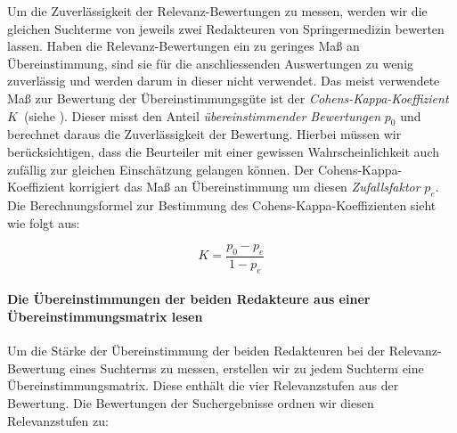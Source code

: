 Um die Zuverlässigkeit der Relevanz-Bewertungen zu messen, werden wir die gleichen Suchterme von jeweils zwei Redakteuren von Springermedizin bewerten lassen. Haben die Relevanz-Bewertungen ein zu geringes Maß an Übereinstimmung, sind sie für die anschliessenden Auswertungen zu wenig zuverlässig und werden darum in dieser nicht verwendet. Das meist verwendete Maß zur Bewertung der Übereinstimmungsgüte ist der \textit{Cohens-Kappa-Koeffizient} $K$~(siehe \cite{Kappa}). Dieser misst den Anteil \textit{übereinstimmender Bewertungen} $p_0$ und berechnet daraus die Zuverlässigkeit der Bewertung. Hierbei müssen wir berücksichtigen, dass die Beurteiler mit einer gewissen Wahrscheinlichkeit auch zufällig zur gleichen Einschätzung gelangen können. Der Cohens-Kappa-Koeffizient korrigiert das Maß an Übereinstimmung um diesen \textit{Zufallsfaktor} $p_e$. Die Berechnungsformel zur Bestimmung des Cohens-Kappa-Koeffizienten sieht wie folgt aus:

\vspace{-1.5em}
\begin{equation}	
	K = \frac{p_0 - p_e}{1 - p_e}
\end{equation}
\vspace{-1.5em}

\paragraph{Die Übereinstimmungen der beiden Redakteure aus einer Übereinstimmungsmatrix lesen}
Um die Stärke der Übereinstimmung der beiden Redakteuren bei der Relevanz-Bewertung eines Suchterms zu messen, erstellen wir zu jedem Suchterm eine Übereinstimmungsmatrix. Diese enthält die vier Relevanzstufen aus der Bewertung. Die Bewertungen der Suchergebnisse ordnen wir diesen Relevanzstufen zu:


